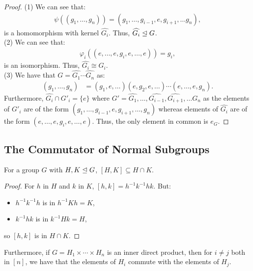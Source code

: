 \begin{proof}
    (1) We can see that: \begin{align*}
        \psi((g_1, \ldots, g_n)) = (g_1, \ldots, g_{i - 1}, e, g_{i + 1}, \ldots g_n),
    \end{align*} is a homomorphism with kernel $\widehat{G_i}$. Thus,
    $\widehat{G_i} \trianglelefteq G$.
    \\[\baselineskip]
    (2) We can see that: \begin{align*}
        \varphi_i((e, \ldots, e, g_i, e, \ldots, e)) = g_i,
    \end{align*} is an isomorphism. Thus, $\widehat{G_i} \cong G_i$.
    \\[\baselineskip]
    (3) We have that $G = \widehat{G_1} \cdots \widehat{G_n}$ as:
    \begin{align*}
        (g_1, \ldots, g_n)
        &= (g_1, e, \ldots)(e, g_2, e, \ldots)
        \cdots (e, \ldots, e, g_n).
    \end{align*} Furthermore, $\widehat{G_i} \cap G'_i = \{e\}$ where
    $G' = \widehat{G_1}, \ldots, \widehat{G_{i - 1}}, \widehat{G_{i + 1}}, 
    \ldots G_n$ as the elements of $G'_i$ are of the form
    $(g_1, \ldots, g_{i - 1}, e, g_{i + 1}, \ldots, g_n)$ whereas elements
    of $\widehat{G_i}$ are of the form $(e, \ldots, e, g_i, e, \ldots, e)$.
    Thus, the only element in common is $e_G$.
\end{proof}

\subsection{The Commutator of Normal Subgroups}

For a group $G$ with $H, K \trianglelefteq G$, $[H, K] \subseteq H \cap K$.

\begin{proof}
    For $h$ in $H$ and $k$ in $K$, $[h, k] = h^{-1}k^{-1}hk$.
    But: \begin{itemize}
        \item $h^{-1}k^{-1}h$ is in $h^{-1}Kh = K$,
        \item $k^{-1}hk$ is in $k^{-1}Hk = H$,
    \end{itemize} so $[h, k]$ is in $H \cap K$.
\end{proof} 

\noindent
Furthermore, if $G = H_1 \times \cdots \times H_n$
is an inner direct product, then for $i \neq j$ both in $[n]$,
we have that the elements of $H_i$ commute with the elements of
$H_j$.

